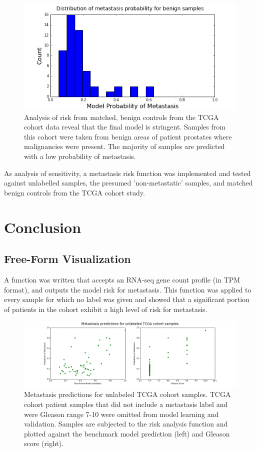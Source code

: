 \documentclass[final]{article}
\begin{document}
\begin{figure}
  \centering
  \includegraphics[scale = 0.5]{Sensitivity}
  \caption{\label{fig:Sensitivity}Analysis of risk from matched, benign controls from the TCGA cohort data reveal that the final model is stringent.  Samples from this cohort were taken from benign areas of patient prostates where malignancies were present.  The majority of samples are predicted with a low probability of metastasis.}
\end{figure}

As analysis of sensitivity, a metastasis risk function was implemented and tested
against unlabelled samples, the presumed 'non-metastatic' samples, and matched
benign controls from the TCGA cohort study.

\section{Conclusion}

\subsection{Free-Form Visualization}

A function was written that accepts an RNA-seq gene count profile (in TPM
format), and outputs the model risk for metastasis.  This function was applied
to every sample for which no label was given and showed that a significant
portion of patients in the cohort exhibit a high level of risk for metastasis.

\begin{figure}[h]
  \centering
  \includegraphics[width=\textwidth]{missing}
  \caption{\label{fig:missing}Metastasis predictions for unlabeled TCGA cohort samples.  TCGA cohort patient samples that did not include a metastasis label and were Gleason range 7-10 were omitted from model learning and validation.  Samples are subjected to the risk analysis function and plotted against the benchmark model prediction (left) and Gleason score (right).}
\end{figure}
\end{document}
